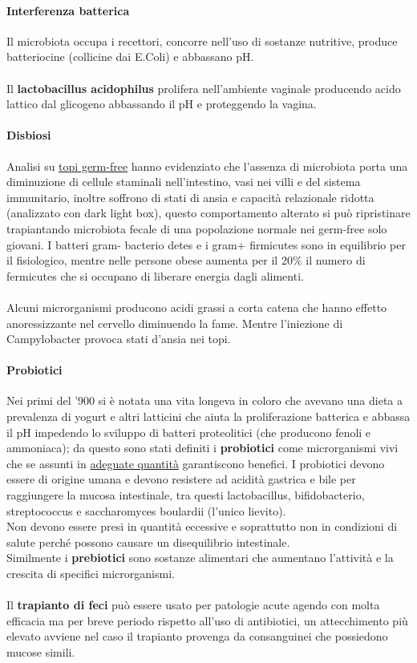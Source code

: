 \documentclass[10pt]{article}
\begin{document}
\paragraph*{Interferenza batterica} Il microbiota occupa i recettori, concorre nell'uso di sostanze nutritive, produce batteriocine (collicine dai E.Coli) e abbassano pH.\\\\
Il \textbf{lactobacillus acidophilus} prolifera nell'ambiente vaginale producendo acido lattico dal glicogeno abbassando il pH e proteggendo la vagina.  \paragraph*{Disbiosi} Analisi su \underline{topi germ-free} hanno evidenziato che l'assenza di microbiota porta una diminuzione di cellule staminali nell'intestino, vasi nei villi e del sistema immunitario, inoltre soffrono di stati di ansia e capacità relazionale ridotta (analizzato con dark light box), questo comportamento alterato si può ripristinare trapiantando microbiota fecale di una popolazione normale nei germ-free solo giovani. I batteri gram- bacterio detes e i gram+ firmicutes sono in equilibrio per il fisiologico, mentre nelle persone obese aumenta per il 20\% il numero di fermicutes che si occupano di liberare energia dagli alimenti. \\\\
Alcuni microrganismi producono acidi grassi a corta catena che hanno effetto anoressizzante nel cervello diminuendo la fame. Mentre l'iniezione di Campylobacter provoca stati d'ansia nei topi.
\paragraph*{Probiotici} Nei primi del '900 si è notata una vita longeva in coloro che avevano una dieta a prevalenza di yogurt e altri latticini che aiuta la proliferazione batterica e abbassa il pH impedendo lo sviluppo di batteri proteolitici (che producono fenoli e ammoniaca); da questo sono stati definiti i \textbf{probiotici} come microrganismi vivi che se assunti in \underline{adeguate quantità} garantiscono benefici. I probiotici devono essere di origine umana e devono resistere ad acidità gastrica e bile per raggiungere la mucosa intestinale, tra questi lactobacillus, bifidobacterio, streptococcus e saccharomyces boulardii (l'unico lievito). \\
Non devono essere presi in quantità eccessive e soprattutto non in condizioni di salute perché possono causare un disequilibrio intestinale.\\
Similmente i \textbf{prebiotici} sono sostanze alimentari che aumentano l'attività e la crescita di specifici microrganismi. \\\\
Il \textbf{trapianto di feci} può essere usato per patologie acute agendo con molta efficacia ma per breve periodo rispetto all'uso di antibiotici, un attecchimento più elevato avviene nel caso il trapianto provenga da consanguinei che possiedono mucose simili.
\end{document}
